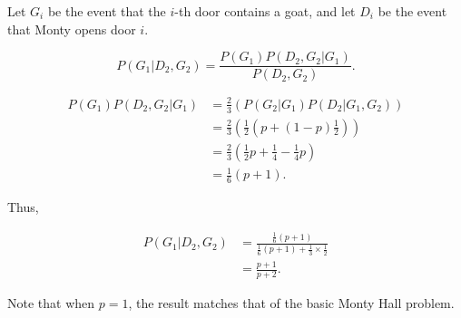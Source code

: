 Let $G_{i}$ be the event that the $i$-th door contains a goat, and let
$D_{i}$ be the event that Monty opens door $i$.

$$P(G_{1}|D_{2}, G_{2}) = \frac{P(G_{1})P(D_{2}, G_{2} | G_{1})}{P(D_{2}, G_
{2})}.$$

\begin{align*}
P(G_{1})P(D_{2}, G_{2} | G_{1}) &= \frac{2}{3}\left(P(G_{2} | G_{1})P(D_
{2} | G_{1}, G_{2})\right) \\ 
&= \frac{2}{3}\left(\frac{1}{2}(p + (1 - p)\frac{1}{2})\right) \\
&= \frac{2}{3}\left(\frac{1}{2}p + \frac{1}{4} - \frac{1}{4}p\right) \\
&= \frac{1}{6}(p + 1).
\end{align*}

Thus,

\begin{align*}
P(G_{1}|D_{2}, G_{2}) &= \frac{\frac{1}{6}(p+1)}{\frac{1}{6}(p+1) + \frac{1}
{3} \times \frac{1}{2}} \\
&= \frac{p + 1}{p + 2}.
\end{align*}

Note that when $p=1$, the result matches that of the basic Monty Hall
problem.